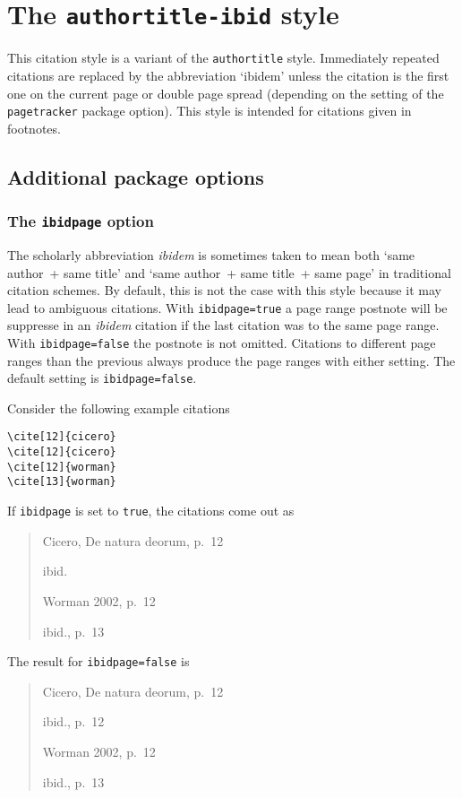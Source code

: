 \documentclass[a4paper]{article}
\begin{document}
\section*{The \texttt{authortitle-ibid} style}

This citation style is a variant of the \texttt{authortitle} style.
Immediately repeated citations are replaced by the abbreviation
`ibidem' unless the citation is the first one on the current page or
double page spread (depending on the setting of the
\texttt{pagetracker} package option). This style is intended for
citations given in footnotes.

\subsection*{Additional package options}

\subsubsection*{The \texttt{ibidpage} option}

The scholarly abbreviation \emph{ibidem} is sometimes taken to mean
both `same author~+ same title' and `same author~+ same title~+ same
page' in traditional citation schemes. By default, this is not the
case with this style because it may lead to ambiguous citations.
With \texttt{ibidpage=true} a page range postnote will be suppresse
in an \emph{ibidem} citation if the last citation was to the same
page range. With \texttt{ibidpage=false} the postnote is not omitted.
Citations to different page ranges than the previous always produce
the page ranges with either setting.
The default setting is \texttt{ibidpage=false}.

Consider the following example citations
\begin{verbatim}
\cite[12]{cicero}
\cite[12]{cicero}
\cite[12]{worman}
\cite[13]{worman}
\end{verbatim}
%
If \texttt{ibidpage} is set to \texttt{true}, the citations
come out as
\begin{quote}
Cicero, De natura deorum, p.~12

ibid.

Worman 2002, p.~12

ibid., p.~13
\end{quote}
%
The result for \texttt{ibidpage=false} is
\begin{quote}
Cicero, De natura deorum, p.~12

ibid., p.~12

Worman 2002, p.~12

ibid., p.~13
\end{quote}
\end{document}
